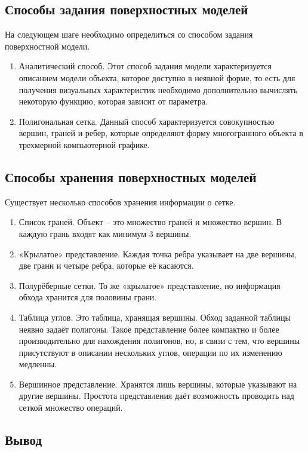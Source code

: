 \subsection{Способы задания поверхностных моделей}

На следующем шаге необходимо определиться со способом задания поверхностной модели.
\begin{enumerate}
	\item Аналитический способ.
	Этот способ задания модели характеризуется описанием модели объекта, которое доступно в неявной форме, то есть для получения визуальных характеристик необходимо дополнительно вычислять некоторую функцию, которая зависит от параметра.
	\item Полигональная сетка.
	Данный способ характеризуется совокупностью вершин, граней и ребер, которые определяют форму многогранного объекта в трехмерной компьютерной графике.
\end{enumerate}

\subsection{Способы хранения поверхностных моделей}
Существует несколько способов хранения информации о сетке.
\begin{enumerate}
	\item Список граней.
	Объект – это множество граней и множество вершин. В каждую грань входят как минимум 3 вершины.
	\item «Крылатое» представление.
	Каждая точка ребра указывает на две вершины, две грани и четыре ребра, которые её касаются.
	\item Полурёберные сетки.
	То же «крылатое» представление, но информация обхода хранится для половины грани.
	\item Таблица углов.
	Это таблица, хранящая вершины. Обход заданной таблицы неявно задаёт полигоны. Такое представление более компактно и более производительно для нахождения полигонов, но, в связи с тем, что вершины присутствуют в описании нескольких углов, операции по их изменению медленны.
	\item Вершинное представление.
	Хранятся лишь вершины, которые указывают на другие вершины. Простота представления даёт возможность проводить над сеткой множество операций.
\end{enumerate}

\subsection*{Вывод}

